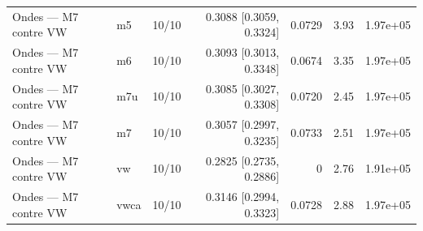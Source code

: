 \begin{tabular}{lllrrrr}
Ondes — M7 contre VW & m5 & 10/10 & 0.3088 [0.3059, 0.3324] & 0.0729 & 3.93 & 1.97e+05 \\
Ondes — M7 contre VW & m6 & 10/10 & 0.3093 [0.3013, 0.3348] & 0.0674 & 3.35 & 1.97e+05 \\
Ondes — M7 contre VW & m7u & 10/10 & 0.3085 [0.3027, 0.3308] & 0.0720 & 2.45 & 1.97e+05 \\
Ondes — M7 contre VW & m7 & 10/10 & 0.3057 [0.2997, 0.3235] & 0.0733 & 2.51 & 1.97e+05 \\
Ondes — M7 contre VW & vw & 10/10 & 0.2825 [0.2735, 0.2886] & 0 & 2.76 & 1.91e+05 \\
Ondes — M7 contre VW & vwca & 10/10 & 0.3146 [0.2994, 0.3323] & 0.0728 & 2.88 & 1.97e+05 \\
\bottomrule
\end{tabular}
